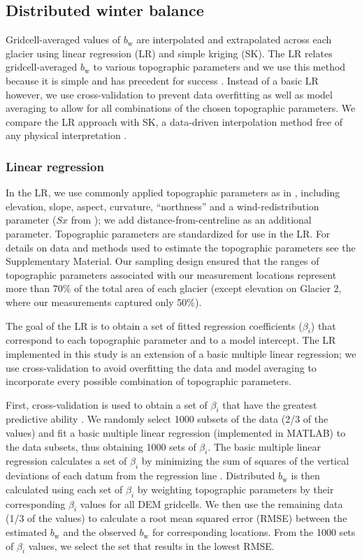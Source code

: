 \documentclass[twocolumn, letterpaper]{igs}
\begin{document}
\subsection{Distributed winter balance}

Gridcell-averaged values of $b_\mathrm{w}$ are interpolated and extrapolated across each glacier using linear regression (LR) and simple kriging (SK). The LR relates gridcell-averaged $b_\mathrm{w}$ to various topographic parameters and we use this method because it is simple and has precedent for success \citep[e.g.][]{McGrath2015}. Instead of a basic LR however, we use cross-validation to prevent data overfitting as well as model averaging to allow for all combinations of the chosen topographic parameters. We compare the LR approach with SK, a data-driven interpolation method free of any physical interpretation \citep[e.g.][]{Hock1999}.

\subsubsection{Linear regression}

In the LR, we use commonly applied topographic parameters as in \cite{McGrath2015}, including elevation, slope, aspect, curvature, ``northness'' and a wind-redistribution parameter ($Sx$ from \cite{Winstral2002}); we add distance-from-centreline as an additional parameter. Topographic parameters are standardized for use in the LR. For details on data and methods used to estimate the topographic parameters see the Supplementary Material. Our sampling design ensured that the ranges of topographic parameters associated with our measurement locations represent more than 70\% of the total area of each glacier (except elevation on Glacier 2, where our measurements captured only 50\%). 

The goal of the LR is to obtain a set of fitted regression coefficients ($\beta_i$) that correspond to each topographic parameter and to a model intercept. The LR implemented in this study is an extension of a basic multiple linear regression; we use cross-validation to avoid overfitting the data and model averaging to incorporate every possible combination of topographic parameters. 

First, cross-validation is used to obtain a set of $\beta_i$ that have the greatest predictive ability \citep{Kohavi1995}. We randomly select 1000 subsets of the data (2/3 of the values) and fit a basic multiple linear regression (implemented in MATLAB) to the data subsets, thus obtaining 1000 sets of $\beta_i$. The basic multiple linear regression calculates a set of $\beta_i$ by minimizing the sum of squares of the vertical deviations of each datum from the regression line \citep{Davis1986}. Distributed $b_\mathrm{w}$ is then calculated using each set of $\beta_i$ by weighting topographic parameters by their corresponding $\beta_i$ values for all DEM gridcells. We then use the remaining data (1/3 of the values) to calculate a root mean squared error (RMSE) between the estimated $b_\mathrm{w}$ and the observed $b_\mathrm{w}$ for corresponding locations. From the 1000 sets of $\beta_i$ values, we select the set that results in the lowest RMSE. 
\end{document}
